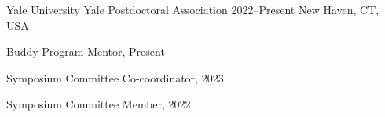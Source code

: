 \begin{cventries}


  \cventry
    {Yale University} %
    {Yale Postdoctoral Association} %
    {2022--Present} %
    {New Haven, CT, USA} %
    {
      \begin{cvitems}
        \item Buddy Program Mentor, Present
        \item Symposium Committee Co-coordinator, 2023
        \item Symposium Committee Member, 2022 
      \end{cvitems}
    }

    

    

\end{cventries}

